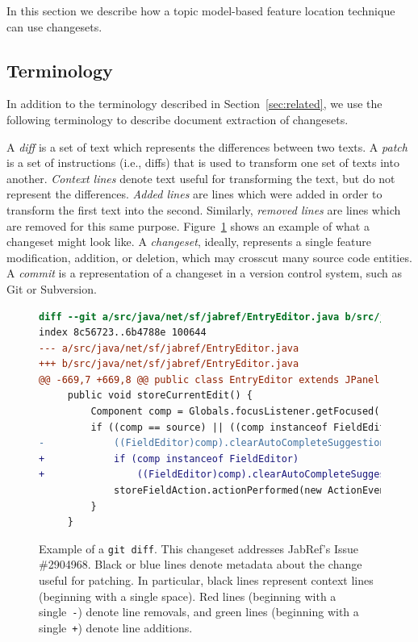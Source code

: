 
In this section we describe how a topic model-based feature location
technique can use changesets.

\subsection{Terminology}

In addition to the terminology described in Section~\ref{sec:related},
we use the following terminology to describe document extraction of changesets.

A \textit{diff} is a set of text which represents the differences between two texts.
A \textit{patch} is a set of instructions (i.e., diffs) that is used to transform one set of texts into another.
\textit{Context lines} denote text useful for transforming the text, but do not represent the differences.
\textit{Added lines} are lines which were added in order to transform the first text into the second.
Similarly, \textit{removed lines} are lines which are removed for this same purpose.
Figure~\ref{fig:diff} shows an example of what a changeset might look like.
A \textit{changeset}, ideally, represents a single feature modification,
addition, or deletion, which may crosscut many source code entities.
A \textit{commit} is a representation of a changeset in a version control system, such as Git or Subversion.


\begin{figure}[t]
\centering
\footnotesize
\begin{lstlisting}[language=diff, basicstyle=\ttfamily]
diff --git a/src/java/net/sf/jabref/EntryEditor.java b/src/java/net/sf/jabref/EntryEditor.java
index 8c56723..6b4788e 100644
--- a/src/java/net/sf/jabref/EntryEditor.java
+++ b/src/java/net/sf/jabref/EntryEditor.java
@@ -669,7 +669,8 @@ public class EntryEditor extends JPanel implements VetoableChangeListener {
     public void storeCurrentEdit() {
         Component comp = Globals.focusListener.getFocused();
         if ((comp == source) || ((comp instanceof FieldEditor) && this.isAncestorOf(comp))) {
-            ((FieldEditor)comp).clearAutoCompleteSuggestion();
+            if (comp instanceof FieldEditor)
+                ((FieldEditor)comp).clearAutoCompleteSuggestion();
             storeFieldAction.actionPerformed(new ActionEvent(comp, 0, ""));
         }
     }
\end{lstlisting}
\caption{Example of a \texttt{git diff}.
This changeset addresses JabRef's Issue \#2904968.
Black or blue lines denote metadata about the change useful for patching.
In particular, black lines represent context lines (beginning with a single space).
Red lines (beginning with a single~\texttt{-}) denote line removals,
and green lines (beginning with a single~\texttt{+}) denote line additions.}
\label{fig:diff}
\vspace{-10pt}
\end{figure}

